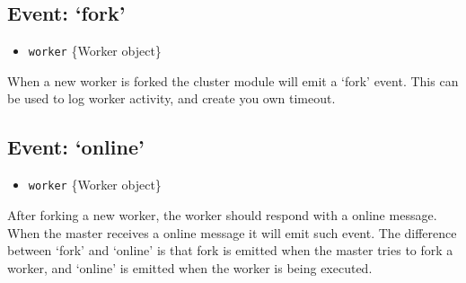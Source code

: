 \subsection{Event: `fork'}

\begin{itemize}
\item
  \texttt{worker} \{Worker object\}
\end{itemize}

When a new worker is forked the cluster module will emit a `fork' event.
This can be used to log worker activity, and create you own timeout.

\begin{Shaded}
\begin{Highlighting}[]
 
 
  \NormalTok{(}\NormalTok{);}
\NormalTok{\}}

\NormalTok{(}\NormalTok{, }
  \NormalTok{timeouts[}\NormalTok{] = setTimeout(errorMsg, }\NormalTok{);}
\NormalTok{\});}
\NormalTok{(}\NormalTok{, }
  \NormalTok{clearTimeout(timeouts[}\NormalTok{]);}
\NormalTok{\});}
\NormalTok{(}\NormalTok{, }
  \NormalTok{clearTimeout(timeouts[}\NormalTok{]);}
\NormalTok{\});}
\end{Highlighting}
\end{Shaded}

\subsection{Event: `online'}

\begin{itemize}
\item
  \texttt{worker} \{Worker object\}
\end{itemize}

After forking a new worker, the worker should respond with a online
message. When the master receives a online message it will emit such
event. The difference between `fork' and `online' is that fork is
emitted when the master tries to fork a worker, and `online' is emitted
when the worker is being executed.

